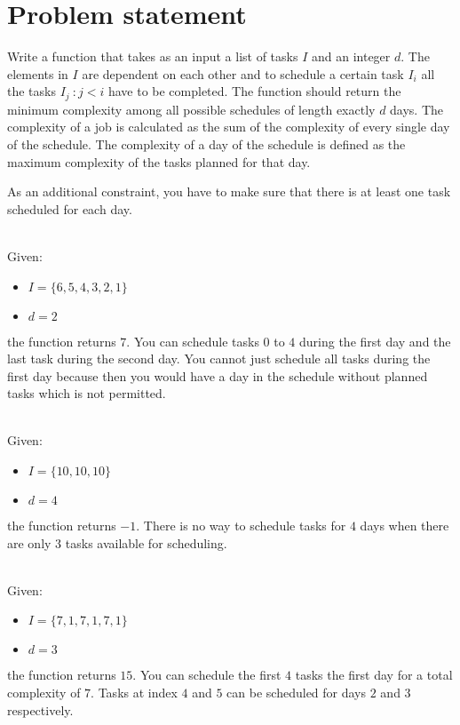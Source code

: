 \section{Problem statement}
\begin{exercise}
    Write a function that takes as an input a list of tasks $I$ and an integer $d$. The elements in
    $I$ are dependent on each other and to schedule a certain task $I_i$ all the tasks $I_j \: : j <
    i$ have to be completed. The function should return the minimum complexity among all possible
    schedules of length exactly $d$ days. The complexity of a job is calculated as the sum of the
    complexity of every single day of the schedule. The complexity of a day of the schedule is
    defined as the maximum complexity of the tasks planned for that day.

    As an additional constraint, you have to make sure that there is at least one task scheduled for
    each day.
        
    \begin{example}
        \hfill \\
        Given:
        \begin{itemize}
            \item $I = \{6,5,4,3,2,1\}$
            \item $d = 2$
        \end{itemize}
        the function returns $7$. You can schedule tasks $0$ to $4$ during the first day and the
        last task during the second day. You cannot just schedule all tasks during the first day
        because then you would have a day in the schedule without planned tasks which is not
        permitted.
    \end{example}
    
    \begin{example}
        \hfill \\
        Given:
        \begin{itemize}
            \item $I = \{10,10,10\}$
            \item $d = 4$
        \end{itemize}
        the function returns $-1$. There is no way to schedule tasks for $4$ days when there are
        only $3$ tasks available for scheduling.
    \end{example}

        
    \begin{example}
        \hfill \\
        Given:
        \begin{itemize}
            \item $I = \{7,1,7,1,7,1\}$
            \item $d = 3$
        \end{itemize}
        the function returns $15$. You can schedule the first $4$ tasks the first day for a total
        complexity of $7$. Tasks at index $4$ and $5$ can be scheduled for days $2$ and $3$
        respectively. 


\end{example}
\end{exercise}
